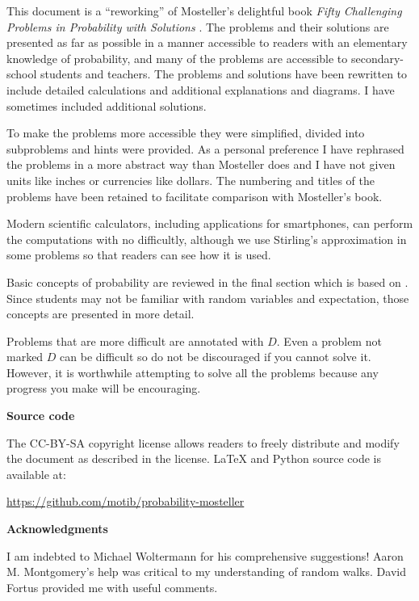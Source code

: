 This document is a ``reworking'' of Mosteller's delightful book \textit{Fifty Challenging Problems in Probability with Solutions} \cite{fifty}. The problems and their solutions are presented as far as possible in a manner accessible to readers with an elementary knowledge of probability, and many of the problems are accessible to secondary-school students and teachers. The problems and solutions have been rewritten to include detailed calculations and additional explanations and diagrams. I have sometimes included additional solutions.

To make the problems more accessible they were simplified, divided into subproblems and hints were provided. As a personal preference I have rephrased the problems in a more abstract way than Mosteller does and I have not given units like inches or currencies like dollars. The numbering and titles of the problems have been retained to facilitate comparison with Mosteller's book.

Modern scientific calculators, including applications for smartphones, can perform the computations with no difficultly, although we use Stirling's approximation in some problems so that readers can see how it is used.

Basic concepts of probability are reviewed in the final section which is based on \cite{ross}. Since students may not be familiar with random variables and expectation, those concepts are presented in more detail.

Problems that are more difficult are annotated with $D$. Even a problem not marked $D$ can be difficult so do not be discouraged if you cannot solve it. However, it is worthwhile attempting to solve all the problems because any progress you make will be encouraging.

\textbf{Source code}

The CC-BY-SA copyright license allows readers to freely distribute and modify the document as described in the license. \LaTeX{} and Python source code is available at:
\vspace*{-2ex}
\begin{center}
\url{https://github.com/motib/probability-mosteller}
\end{center}
\textbf{Acknowledgments}

I am indebted to Michael Woltermann for his comprehensive suggestions! Aaron M. Montgomery's help was critical to my understanding of random walks. David Fortus provided me with useful comments.

\newpage

